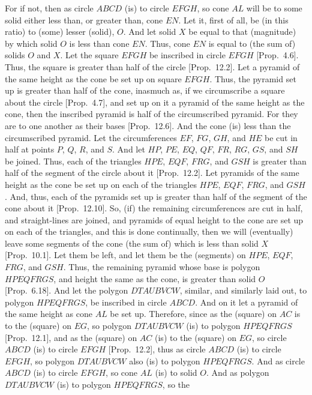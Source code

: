 \begin{Parallel}{}{}
{For if not, then as circle $ABCD$ (is) to circle $EFGH$, so cone $AL$ will be to some solid either less than, or
greater than, cone $EN$. Let it, first of all, be (in this ratio) to (some) lesser (solid), $O$. And let solid $X$ be equal to
that (magnitude) by which solid $O$ is less than cone $EN$. Thus, cone $EN$ is equal to (the sum of) solids
$O$ and $X$. Let the square $EFGH$ be inscribed in circle $EFGH$ [Prop.~4.6].
Thus, the square is greater than half of the circle [Prop.~12.2]. Let a pyramid
of the same height as the cone be set up on square $EFGH$. Thus, the pyramid set up is
greater than half of the cone, inasmuch as, if we circumscribe a square about the circle [Prop.~4.7], and set up  on it a pyramid of the same height as the cone, then the inscribed pyramid
is half of the circumscribed pyramid.  For they are to one another as their 
bases [Prop.~12.6]. And the cone (is) less than the circumscribed pyramid. 
Let the circumferences $EF$, $FG$, $GH$, and $HE$ be cut in half at points $P$, $Q$, $R$,
and $S$. And let $HP$, $PE$, $EQ$, $QF$, $FR$, $RG$, $GS$, and $SH$ be joined.
Thus, each of the triangles $HPE$, $EQF$, $FRG$, and $GSH$ is greater than half of the segment of
the circle about it [Prop.~12.2]. Let pyramids of the same height
as the cone be set up on each of the triangles $HPE$, $EQF$, $FRG$, and $GSH$.  And, thus, each of
the pyramids set up is greater than half of the segment of the cone about it [Prop.~12.10].
So, (if) the remaining circumferences are cut in half, and straight-lines are joined, and pyramids  of equal height to the cone are
set up on each of the triangles, and this is 
done continually, then we will (eventually) leave some segments of the cone (the sum of) which is less 
than solid $X$ [Prop.~10.1]. Let them be left, and let them be the
(segments) on $HPE$, $EQF$, $FRG$, and $GSH$. Thus, the remaining pyramid whose base is
polygon $HPEQFRGS$, and height the same as the cone, is greater than solid $O$ [Prop.~6.18]. 
And let the polygon $DTAUBVCW$, similar, and similarly laid out, to polygon $HPEQFRGS$, be
inscribed in circle $ABCD$. And on it let a pyramid of the same height as cone 
$AL$ be set up.
Therefore, since as the (square) on $AC$ is to the (square) on $EG$, so polygon $DTAUBVCW$ (is) to
polygon $HPEQFRGS$ [Prop.~12.1], and as the (square) on $AC$ (is) to the (square) on $EG$,
so circle $ABCD$ (is) to circle $EFGH$ [Prop.~12.2], thus as circle $ABCD$ (is) to
circle $EFGH$, so polygon $DTAUBVCW$ also (is) to polygon $HPEQFRGS$. And as circle $ABCD$ (is) to circle
$EFGH$, so cone $AL$ (is) to solid $O$. And as polygon $DTAUBVCW$ (is) to polygon $HPEQFRGS$, so the
}
\end{Parallel}
